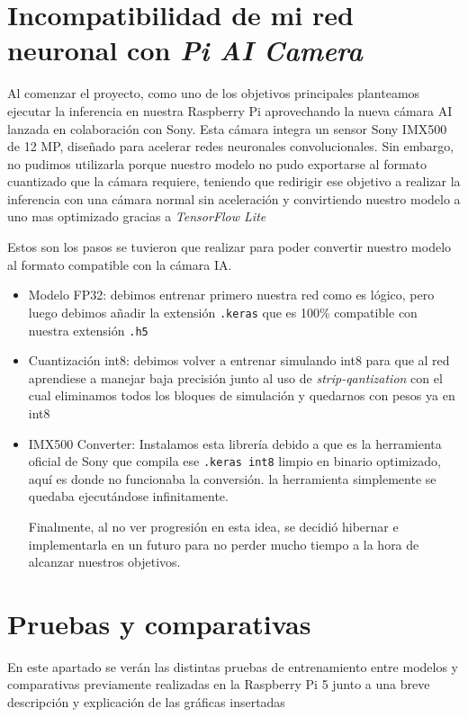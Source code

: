 \section{Incompatibilidad de mi red neuronal con \textit{Pi AI Camera}}

Al comenzar el proyecto, como uno de los objetivos principales planteamos ejecutar la inferencia en nuestra Raspberry Pi aprovechando la nueva cámara AI lanzada en colaboración con Sony. Esta cámara integra un sensor Sony IMX500 de 12 MP, diseñado para acelerar redes neuronales convolucionales. Sin embargo, no pudimos utilizarla porque nuestro modelo no pudo exportarse al formato cuantizado que la cámara requiere, teniendo que redirigir ese objetivo a realizar la inferencia con una cámara normal sin aceleración y convirtiendo nuestro modelo a uno mas optimizado gracias a \textit{TensorFlow Lite}

Estos son los pasos se tuvieron que realizar para poder convertir nuestro modelo al formato compatible con la cámara IA.

\begin{itemize}
    \item Modelo FP32: debimos entrenar primero nuestra red como es lógico, pero luego debimos añadir la extensión \texttt{.keras} que es 100\% compatible con nuestra extensión \texttt{.h5}

    \item Cuantización int8: debimos volver a entrenar simulando int8 para que al red aprendiese a manejar baja precisión junto al uso de \textit{strip-qantization} con el cual eliminamos todos los bloques de simulación y quedarnos con pesos ya en int8

    \item IMX500 Converter: Instalamos esta librería debido a que es la herramienta oficial de Sony que compila ese \texttt{.keras int8} limpio en binario optimizado, aquí es donde no funcionaba la conversión. la herramienta simplemente se quedaba ejecutándose infinitamente.

Finalmente, al no ver progresión en esta idea, se decidió hibernar e implementarla en un futuro para no perder mucho tiempo a la hora de alcanzar nuestros objetivos.
    
\end{itemize}





\section{Pruebas y comparativas}
En este apartado se verán las distintas pruebas de entrenamiento entre modelos y comparativas previamente realizadas en la Raspberry Pi 5 junto a una breve descripción y explicación de las gráficas insertadas

